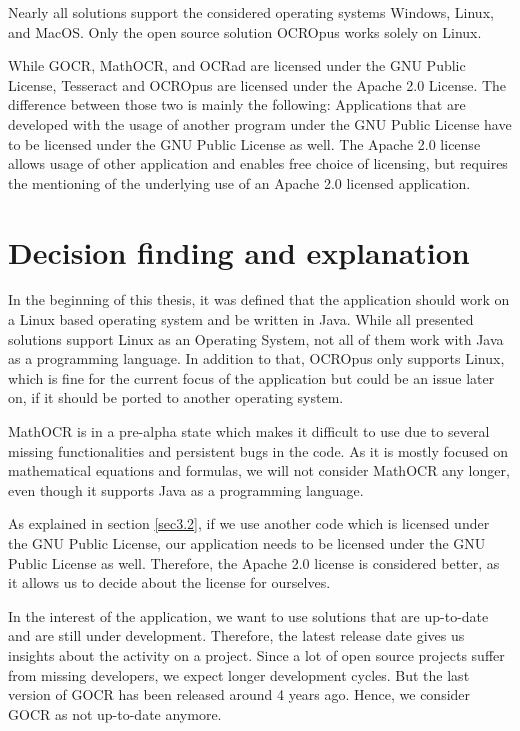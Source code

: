 Nearly all solutions support the considered operating systems Windows, Linux, and MacOS. Only the open source solution OCROpus works solely on Linux.

While GOCR, MathOCR, and OCRad are licensed under the GNU Public License, Tesseract and OCROpus are licensed under the Apache 2.0 License. The difference between those two is mainly the following: Applications that are developed with the usage of another program under the GNU Public License have to be licensed under the GNU Public License as well. The Apache 2.0 license allows usage of other application and enables free choice of licensing, but requires the mentioning of the underlying use of an Apache 2.0 licensed application.

\label{OCRDecision}
\section{Decision finding and explanation}
In the beginning of this thesis, it was defined that the application should work on a Linux based operating system and be written in Java. While all presented solutions support Linux as an Operating System, not all of them work with Java as a programming language. In addition to that, OCROpus only supports Linux, which is fine for the current focus of the application but could be an issue later on, if it should be ported to another operating system.

MathOCR is in a pre-alpha state which makes it difficult to use due to several missing functionalities and persistent bugs in the code. As it is mostly focused on mathematical equations and formulas, we will not consider MathOCR any longer, even though it supports Java as a programming language. 

As explained in section \ref{sec3.2}, if we use another code which is licensed under the GNU Public License, our application needs to be licensed under the GNU Public License as well. Therefore, the Apache 2.0 license is considered better, as it allows us to decide about the license for ourselves.

In the interest of the application, we want to use solutions that are up-to-date and are still under development. Therefore, the latest release date gives us insights about the activity on a project. Since a lot of open source projects suffer from missing developers, we expect longer development cycles. But the last version of GOCR has been released around 4 years ago. Hence, we consider GOCR as not up-to-date anymore.

